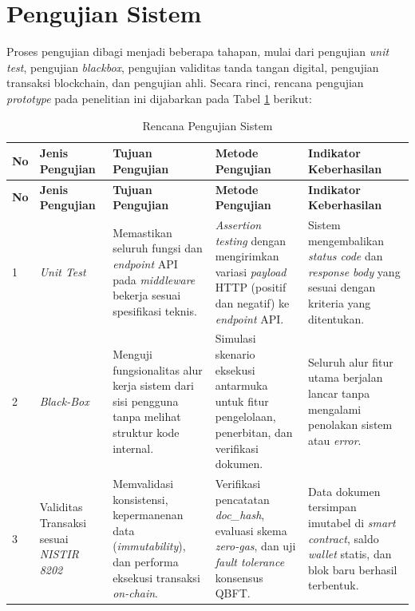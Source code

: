 	\section{Pengujian Sistem}
	\setlength{\leftskip}{0.7cm}
 	Proses pengujian dibagi menjadi beberapa tahapan, mulai dari pengujian \textit{unit test}, pengujian \textit{blackbox}, pengujian validitas tanda tangan digital, pengujian transaksi blockchain, dan pengujian ahli. Secara rinci, rencana pengujian \textit{prototype} pada penelitian ini dijabarkan pada Tabel \ref{tab:rencana_pengujian} berikut:

	\renewcommand{\arraystretch}{1.25}
	
    \begin{longtable}{|
    >{\centering\arraybackslash}p{0.7cm}|
    >{\raggedright\arraybackslash}p{3.1cm}|
    >{\raggedright\arraybackslash}p{3.3cm}|
    >{\raggedright\arraybackslash}p{3.5cm}|
    >{\raggedright\arraybackslash}p{3.3cm}|}

    \caption{Rencana Pengujian Sistem}
    \label{tab:rencana_pengujian} \\

    \hline
    \textbf{No} &
    \textbf{Jenis Pengujian} &
    \textbf{Tujuan Pengujian} &
    \textbf{Metode Pengujian} &
    \textbf{Indikator Keberhasilan} \\ \hline
    \endfirsthead

    \hline
    \textbf{No} &
    \textbf{Jenis Pengujian} &
    \textbf{Tujuan Pengujian} &
    \textbf{Metode Pengujian} &
    \textbf{Indikator Keberhasilan} \\ \hline
    \endhead

    \hline
    \endfoot

    \hline
    \endlastfoot

    1 &
    \textit{Unit Test} &
    Memastikan seluruh fungsi dan \textit{endpoint} API pada \textit{middleware} bekerja sesuai spesifikasi teknis. &
    \textit{Assertion testing} dengan mengirimkan variasi \textit{payload} HTTP (positif dan negatif) ke \textit{endpoint} API. &
    Sistem mengembalikan \textit{status code} dan \textit{response body} yang sesuai dengan kriteria yang ditentukan. \\ \hline

    2 &
    \textit{Black-Box} &
    Menguji fungsionalitas alur kerja sistem dari sisi pengguna tanpa melihat struktur kode internal. &
    Simulasi skenario eksekusi antarmuka untuk fitur pengelolaan, penerbitan, dan verifikasi dokumen. &
    Seluruh alur fitur utama berjalan lancar tanpa mengalami penolakan sistem atau \textit{error}. \\ \hline

    3 &
    Validitas Transaksi sesuai \textit{NISTIR 8202} &
    Memvalidasi konsistensi, kepermanenan data (\textit{immutability}), dan performa eksekusi transaksi \textit{on-chain}. &
    Verifikasi pencatatan \textit{doc\_hash}, evaluasi skema \textit{zero-gas}, dan uji \textit{fault tolerance} konsensus QBFT. &
    Data dokumen tersimpan imutabel di \textit{smart contract}, saldo \textit{wallet} statis, dan blok baru berhasil terbentuk. \\ \hline

    \end{longtable}